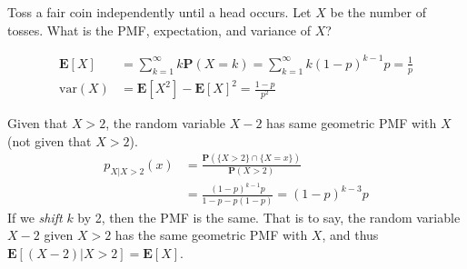 \begin{example}
    Toss a fair coin independently until a head occurs. Let $X$ be the number of tosses. What is the PMF, expectation, and variance of $X$? 
    \begin{solution}
        \begin{equation}
        \begin{aligned}
            \mathbf{E}[X] &= \sum_{k=1}^{\infty} k \mathbf{P}(X = k) = \sum_{k=1}^{\infty} k (1-p)^{k-1} p = \frac{1}{p} \\ 
            \text{var}(X) &= \mathbf{E}[X^{2}] - \mathbf{E}[X]^{2} = \frac{1-p}{p^{2}}
        \end{aligned}
        \end{equation}
    \end{solution}
\end{example}
\begin{property}
    Given that $X > 2$, the random variable $X - 2$ has same geometric PMF with $X$ (not given that $X > 2$). 
    \begin{equation}
    \begin{aligned}
        p_{X|X > 2}(x) &= \frac{\mathbf{P}(\{X > 2\} \cap \{X = x\})}{\mathbf{P}(X > 2)} \\ 
        &= \frac{(1 - p)^{k-1}p}{1 - p - p(1-p)} = (1-p)^{k-3}p
    \end{aligned}
    \end{equation}
    If we \textit{shift} $k$ by 2, then the PMF is the same. That is to say, the random variable $X - 2$ given $X > 2$ has the same geometric PMF with $X$, and thus $\mathbf{E}[(X - 2)|X > 2] = \mathbf{E}[X]$.
\end{property}
